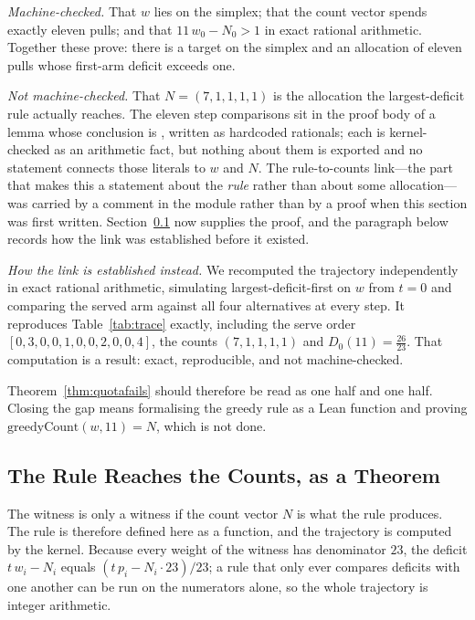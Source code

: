 \emph{Machine-checked.} That $w$ lies on the simplex; that the count vector spends exactly
eleven pulls; and that $11\,w_{0}-N_{0}>1$ in exact rational arithmetic. Together these prove:
there is a target on the simplex and an allocation of eleven pulls whose first-arm deficit
exceeds one.

\emph{Not machine-checked.} That $N=(7,1,1,1,1)$ is the allocation the largest-deficit rule
actually reaches. The eleven step comparisons sit in the proof body of a lemma whose conclusion
is , written as hardcoded rationals; each is kernel-checked as an arithmetic fact,
but nothing about them is exported and no statement connects those literals to $w$ and $N$.
The rule-to-counts link---the part that makes this a statement about the \emph{rule} rather
than about some allocation---was carried by a comment in the module rather than by a proof
when this section was first written. Section~\ref{sec:trace} now supplies the proof, and the
paragraph below records how the link was established before it existed.

\emph{How the link is established instead.} We recomputed the trajectory independently in
exact rational arithmetic, simulating largest-deficit-first on $w$ from $t=0$ and comparing
the served arm against all four alternatives at every step. It reproduces
Table~\ref{tab:trace} exactly, including the serve order $[0,3,0,0,1,0,0,2,0,0,4]$, the counts
$(7,1,1,1,1)$ and $D_{0}(11)=\frac{26}{23}$. That computation is a \NUM{} result: exact,
reproducible, and not machine-checked.

Theorem~\ref{thm:quotafails} should therefore be read as one \PROVED{} half and one \NUM{}
half. Closing the gap means formalising the greedy rule as a Lean function and proving
$\mathrm{greedyCount}(w,11)=N$, which is not done.

\subsection{The Rule Reaches the Counts, as a Theorem}
\label{sec:trace}

The witness is only a witness if the count vector $N$ is what the rule produces. The rule is
therefore defined here as a function, and the trajectory is computed by the kernel. Because
every weight of the witness has denominator $23$, the deficit $t\,w_{i}-N_{i}$ equals
$(t\,p_{i}-N_{i}\cdot23)/23$; a rule that only ever compares deficits with one another can be
run on the numerators alone, so the whole trajectory is integer arithmetic.

